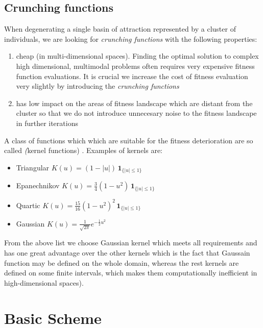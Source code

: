 \subsection{Crunching functions}
When degenerating a single basin of attraction represented by a cluster of
individuals, we are looking for \textit{crunching functions} with the following
properties:

\begin{enumerate}
  \item cheap (in multi-dimensional spaces). Finding the optimal solution to
  complex high dimensional, multimodal problems often requires 
  very expensive fitness function evaluations. It is crucial we increase the
  cost of fitness evaluation very slightly by introducing the \textit{crunching
  functions}
  \item has low impact on the areas of fitness landscape which are distant from
  the cluster so that we do not introduce unnecesary noise to the fitness landscape
  in further iterations
\end{enumerate}

A class of functions which which are suitable for the fitness deterioration are
so called \textit(kernel functions) \cite{kernel}. Examples of kernels are: 
\begin{itemize}
  \item Triangular 	$K(u) = (1-|u|) \,\mathbf{1}_{\{|u|\leq1\}}$
  \item Epanechnikov 	$K(u) = \frac{3}{4}(1-u^2) \,\mathbf{1}_{\{|u|\leq1\}}$
  \item Quartic  $K(u) = \frac{15}{16}(1-u^2)^2 \,\mathbf{1}_{\{|u|\leq1\}}$
  \item Gaussian 	$K(u) = \frac{1}{\sqrt{2\pi}}e^{-\frac{1}{2}u^2}$
\end{itemize}

From the above list we choose Gaussian kernel which meets all requirements and 
has one great advantage over the other kernels which is the fact that
Gaussain function may be defined on the whole domain, whereas the rest
kernels are defined on some finite intervals, which makes them computationally
inefficient in high-dimensional spaces).

\section{Basic Scheme}

